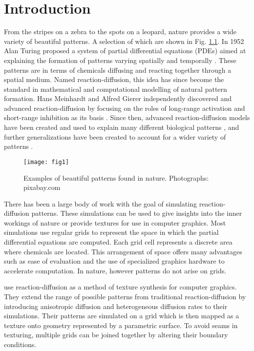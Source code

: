 \chapter{Introduction}
From the stripes on a zebra to the spots on a leopard, nature provides a wide variety of beautiful patterns. A selection of which are shown in Fig. \ref{fig:naturalPatterns1}. In 1952 Alan Turing proposed a system of partial differential equations (PDEs) aimed at explaining the formation of patterns varying spatially and temporally \citep{Turing1952}. These patterns are in terms of chemicals diffusing and reacting together through a spatial medium. Named reaction-diffusion, this idea has since become the standard in mathematical and computational modelling of natural pattern formation. Hans Meinhardt and Alfred Gierer independently discovered and advanced reaction-diffusion by focusing on the roles of long-range activation and short-range inhibition as its basis \citep{gierer1972}. Since then, advanced reaction-diffusion models have been created and used to explain many different biological patterns \citep{GarzonAlvarado2011, fowler1992modeling, lefevre2010reaction}, and further generalizations have been created to account for a wider variety of patterns \citep{KONDO2017120}.

\begin{figure}[H]
  \centering
  \texttt{[image: fig1]}
  \caption{Examples of beautiful patterns found in nature. \textcolor{citation-gray}{Photographs: pixabay.com}}
  \label{fig:naturalPatterns1}
\end{figure}

There has been a large body of work with the goal of simulating reaction-diffusion patterns. These simulations can be used to give insights into the inner workings of nature or provide textures for use in computer graphics. Most simulations use regular grids to represent the space in which the partial differential equations are computed. Each grid cell represents a discrete area where chemicals are located. This arrangement of space offers many advantages such as ease of evaluation and the use of specialized graphics hardware to accelerate computation. In nature, however patterns do not arise on grids. 

\citet{Witkin1991} use reaction-diffusion as a method of texture synthesis for computer graphics. They extend the range of possible patterns from traditional reaction-diffusion by introducing anisotropic diffusion and heterogeneous diffusion rates to their simulations. Their patterns are simulated on a grid which is then mapped as a texture onto geometry represented by a parametric surface.  To avoid seams in texturing, multiple grids can be joined together by altering their boundary conditions. 

